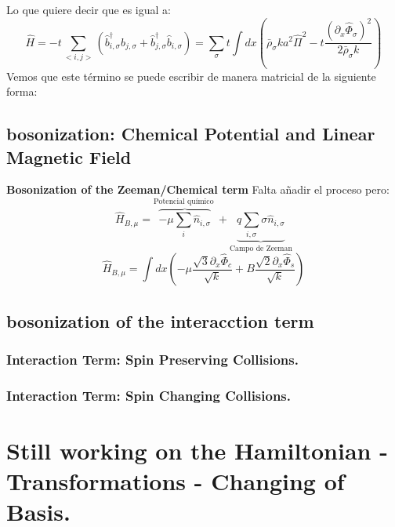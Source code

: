 Lo que quiere decir que es igual a:
\begin{equation}
       \hat{H} = -t \sum_{<i,j>} \left( \hat{b}_{i,\sigma}^{\dagger}\hat{b}_{j,\sigma}^{} + \hat{b}_{j,\sigma}^{\dagger} \hat{b}_{i,\sigma}^{} \right) =\sum_{\sigma} t   \int  dx\left(\bar{\rho}_{\sigma} k a^{2} \hat{\Pi}^{2} - t \frac{(\partial_{x} \hat{\Phi}_{\sigma} )^2}{2 \bar{\rho}_{\sigma} k}  \right)
\end{equation}
Vemos que este término se puede escribir de manera matricial de la siguiente forma:\\ 



\subsection{bosonization: Chemical Potential and Linear Magnetic Field} \textbf{Bosonization of the Zeeman/Chemical term}
Falta añadir el proceso pero:
\begin{equation}
    \hat{H}_{B,\mu}= \overbrace{-\mu \sum_i \hat{n}_{i, \sigma}}^{\text {Potencial químico }}+\underbrace{q \sum_{i, \sigma} \sigma \hat{n}_{i, \sigma}}_{\text {Campo de Zeeman}}
\end{equation}
\begin{equation}
    \hat{H}_{B,\mu}=\int dx \left( -\mu \frac{\sqrt{3} \partial_{x}\hat{\Phi}_c}{\sqrt{k}}  + B \frac{\sqrt{2} \partial_{x}\hat{\Phi}_s}{\sqrt{k}} \right)
\end{equation}




\subsection{bosonization of the interacction term}
\subsubsection{Interaction Term: Spin Preserving Collisions.}


\subsubsection{Interaction Term: Spin Changing Collisions.}

\section{Still working on the Hamiltonian - Transformations - Changing of Basis.}

